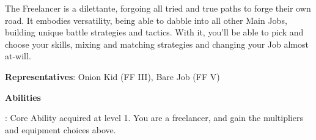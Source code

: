 \begin{jobdesc}[name=pjob-freelancer]
    The Freelancer is a dilettante, forgoing all tried and true paths to forge their own road. It embodies versatility, being able to dabble into all other Main Jobs, building unique battle strategies and tactics. With it, you’ll be able to pick and choose your skills, mixing and matching strategies and changing your Job almost at-will. \pc

    \textbf{Representatives}: Onion Kid (FF III), Bare Job (FF V) \pc

    \jobstats[hpa=3x,hpb=4x,hpc=5x,hpd=6x,mpa=1x,mpb=2x,mpc=3x,armor=none,weapons=none]
\end{jobdesc}

\begin{ffminipage}
{\centering \textbf{Abilities}\par }

\noindent{}: Core Ability acquired at level 1. You are a freelancer, and gain the multipliers and equipment choices above.


\end{ffminipage}
